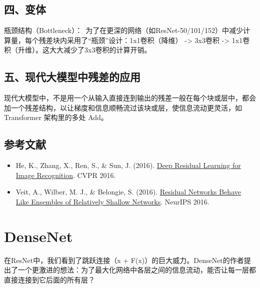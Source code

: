\hypertarget{ux56dbux53d8ux4f53}{%
\subsection{四、变体}\label{ux56dbux53d8ux4f53}}

瓶颈结构（Bottleneck）：~为了在更深的网络（如ResNet-50/101/152）中减少计算量，每个残差块内采用了``瓶颈''设计：1x1卷积（降维） -\textgreater{} 3x3卷积 -\textgreater{} 1x1卷积（升维）。这大大减少了3x3卷积的计算开销。

\hypertarget{ux4e94ux73b0ux4ee3ux5927ux6a21ux578bux4e2dux6b8bux5deeux7684ux5e94ux7528}{%
\subsection{五、现代大模型中残差的应用}\label{ux4e94ux73b0ux4ee3ux5927ux6a21ux578bux4e2dux6b8bux5deeux7684ux5e94ux7528}}

现代大模型中，不是用一个从输入直接连到输出的残差一般在每个块或层中，都会加一个残差结构，以让梯度和信息顺畅流过该块或层，使信息流动更灵活，如 Transformer 架构里的多处 Add。

\hypertarget{ux53c2ux8003ux6587ux732e-14}{%
\subsection{参考文献}\label{ux53c2ux8003ux6587ux732e-14}}

\vspace{0.25em}
\begin{itemize}
\tightlist
\item
  He, K., Zhang, X., Ren, S., \& Sun, J. (2016). \href{https://arxiv.org/abs/1512.03385}{Deep Residual Learning for Image Recognition}. CVPR 2016.
\item
  Veit, A., Wilber, M. J., \& Belongie, S. (2016). \href{https://proceedings.neurips.cc/paper_files/paper/2016/hash/37bc2f75bf1bcfe8450a1a41c200364c-Abstract.html}{Residual Networks Behave Like Ensembles of Relatively Shallow Networks}. NeurIPS 2016.
\end{itemize}

\clearpage

\hypertarget{densenet}{%
\section{DenseNet}\label{densenet}}

在ResNet中，我们看到了跳跃连接（x + F(x)）的巨大威力。DenseNet的作者提出了一个更激进的想法：为了最大化网络中各层之间的信息流动，能否让每一层都直接连接到它后面的所有层？

